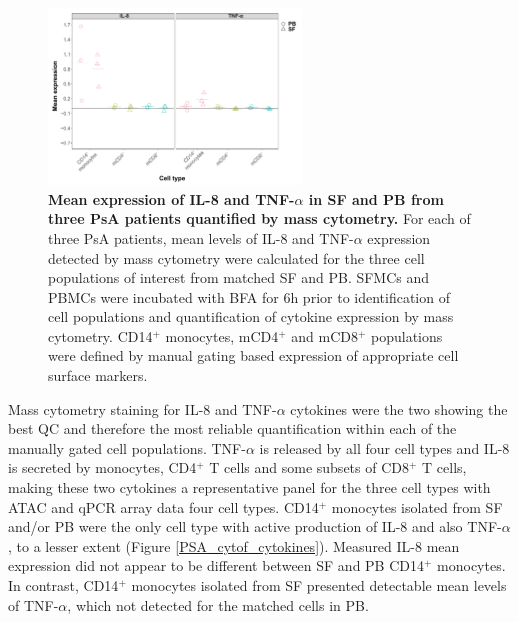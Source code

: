 \begin{figure}[htbp]
\centering
\includegraphics[width=0.6\textwidth]{./Results3/pdfs/CyTOF_ICS_cytokines_production_IL8_TNF}
\caption[Mean expression of IL-8 and TNF-$\alpha$ markers in SF and PB from three PsA patients quantified by mass cytometry.]{\textbf{Mean expression of IL-8 and TNF-$\alpha$ in SF and PB from three PsA patients quantified by mass cytometry.} For each of three PsA patients, mean levels of IL-8 and TNF-$\alpha$ expression detected by mass cytometry were calculated for the three cell populations of interest from matched SF and PB. SFMCs and PBMCs were incubated with BFA for 6h prior to identification of cell populations and quantification of cytokine expression by mass cytometry. CD14$^+$ monocytes, mCD4$^+$ and mCD8$^+$ populations were defined by manual gating based expression of appropriate cell surface markers.}
\label{figure:PSA_cytof_cytokines}
\end{figure}

Mass cytometry staining for IL-8 and TNF-$\alpha$ cytokines were the two showing the best QC and therefore the most reliable quantification within each of the manually gated cell populations. TNF-$\alpha$ is released by all four cell types and IL-8 is secreted by monocytes, CD4$^+$ T cells and some subsets of CD8$^+$ T cells, making these two cytokines a representative panel for the three cell types with ATAC and qPCR array data four cell types. CD14$^+$ monocytes isolated from SF and/or PB were the only cell type with active production of IL-8 and also TNF-$\alpha$, to a lesser extent (Figure \ref{PSA_cytof_cytokines}). Measured IL-8 mean expression did not appear to be different between SF and PB CD14$^+$ monocytes. In contrast, CD14$^+$ monocytes isolated from SF presented detectable mean levels of TNF-$\alpha$, which not detected for the matched cells in PB.

